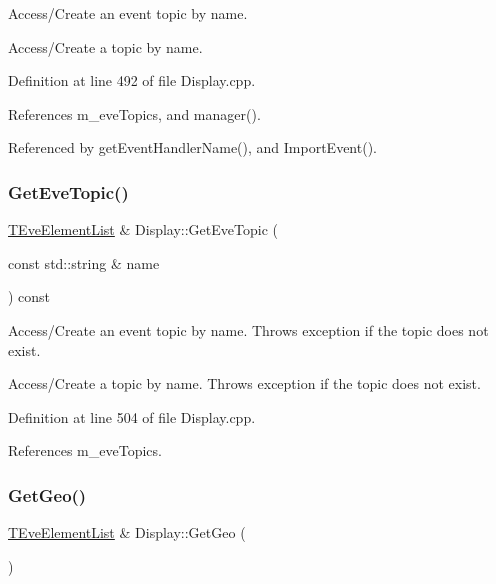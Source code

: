 Access/\+Create an event topic by name. 

Access/\+Create a topic by name. 

Definition at line 492 of file Display.\+cpp.



References m\+\_\+eve\+Topics, and manager().



Referenced by get\+Event\+Handler\+Name(), and Import\+Event().

\hypertarget{class_d_d4hep_1_1_display_a521137252c2195c95b59c603dc227c8e}{}\label{class_d_d4hep_1_1_display_a521137252c2195c95b59c603dc227c8e} 
\subsubsection{\texorpdfstring{Get\+Eve\+Topic()}{GetEveTopic()}\hspace{0.1cm}{\footnotesize\ttfamily [2/2]}}
{\footnotesize\ttfamily \hyperlink{class_t_eve_element_list}{T\+Eve\+Element\+List} \& Display\+::\+Get\+Eve\+Topic (\begin{DoxyParamCaption}\item[{const std\+::string \&}]{name }\end{DoxyParamCaption}) const\hspace{0.3cm}{\ttfamily [virtual]}}



Access/\+Create an event topic by name. Throws exception if the topic does not exist. 

Access/\+Create a topic by name. Throws exception if the topic does not exist. 

Definition at line 504 of file Display.\+cpp.



References m\+\_\+eve\+Topics.

\hypertarget{class_d_d4hep_1_1_display_a6320adb59a4092821ef4623da5547277}{}\label{class_d_d4hep_1_1_display_a6320adb59a4092821ef4623da5547277} 
\subsubsection{\texorpdfstring{Get\+Geo()}{GetGeo()}}
{\footnotesize\ttfamily \hyperlink{class_t_eve_element_list}{T\+Eve\+Element\+List} \& Display\+::\+Get\+Geo (\begin{DoxyParamCaption}{ }\end{DoxyParamCaption})}



